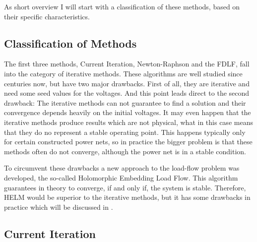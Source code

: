 As short overview I will start with a classification of these methods, based on their specific characteristics.

\subsection{Classification of Methods}

The first three methods, Current Iteration, Newton-Raphson and the FDLF, fall into the category of iterative methods. These algorithms are well studied since centuries now, but have two major drawbacks. First of all, they are iterative and need some seed values for the voltages. And this point leads direct to the second drawback: The iterative methods can not guarantee to find a solution and their convergence depends heavily on the initial voltages. It may even happen that the iterative methods produce results which are not physical, what in this case means that they do no represent a stable operating point. This happens typically only for certain constructed power nets, so in practice the bigger problem is that these methods often do not converge, although the power net is in a stable condition.

To circumvent these drawbacks a new approach to the load-flow problem was developed, the so-called Holomorphic Embedding Load Flow. This algorithm guarantees in theory to converge, if and only if, the system is stable. Therefore, HELM would be superior to the iterative methods, but it has some drawbacks in practice which will be discussed in . 

\subsection{Current Iteration}
\label{sec:current_iteration}

